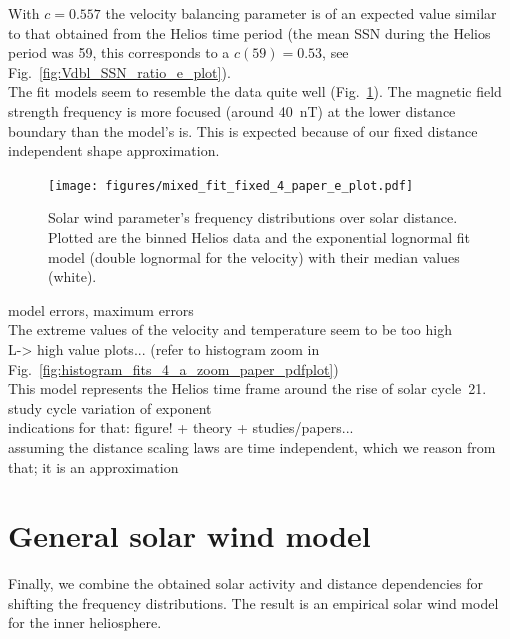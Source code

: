 With $c = 0.557$ the velocity balancing parameter is of an expected value similar to that obtained from the Helios time period (the mean SSN during the Helios period was 59, this corresponds to a $c(59) = 0.53$, see Fig.~\ref{fig:Vdbl_SSN_ratio_e_plot}).\\

The fit models seem to resemble the data quite well (Fig.~\ref{fig:mixed_fit_fixed_4_paper_e_plot}). The magnetic field strength frequency is more focused (around \SI{40}{nT}) at the lower distance boundary than the model's is. This is expected because of our fixed distance independent shape approximation.\\
\begin{figure}
	\texttt{[image: figures/mixed\_fit\_fixed\_4\_paper\_e\_plot.pdf]}
	\caption{Solar wind parameter's frequency distributions over solar distance. Plotted are the binned Helios data and the exponential lognormal fit model (double lognormal for the velocity) with their median values (white).}
	\label{fig:mixed_fit_fixed_4_paper_e_plot}
\end{figure}

model errors, maximum errors\\
The extreme values of the velocity and temperature seem to be too high\\
L-> high value plots... (refer to histogram zoom in Fig.~\ref{fig:histogram_fits_4_a_zoom_paper_pdfplot})\\

This model represents the Helios time frame around the rise of solar cycle~21.\\

study cycle variation of exponent\\
indications for that: figure! + theory + studies/papers...\\
assuming the distance scaling laws are time independent, which we reason from that; it is an approximation\\


\section{General solar wind model}
\label{sec:general_solar_wind_model}

Finally, we combine the obtained solar activity and distance dependencies for shifting the frequency distributions. The result is an empirical solar wind model for the inner heliosphere.\\

